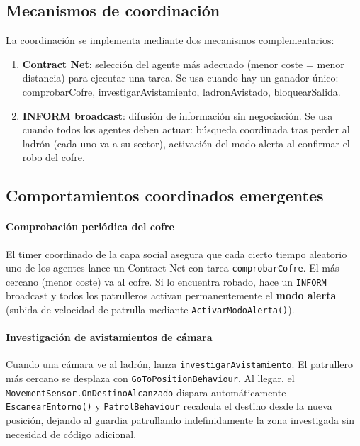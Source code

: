 \documentclass[a4paper,12pt]{article}
\begin{document}
\subsection*{Mecanismos de coordinación}

La coordinación se implementa mediante dos mecanismos complementarios:

\begin{enumerate}
    \item \textbf{Contract Net}: selección del agente más adecuado (menor coste = menor distancia) para ejecutar una tarea. Se usa cuando hay un ganador único: comprobarCofre, investigarAvistamiento, ladronAvistado, bloquearSalida.
    \item \textbf{INFORM broadcast}: difusión de información sin negociación. Se usa cuando todos los agentes deben actuar: búsqueda coordinada tras perder al ladrón (cada uno va a su sector), activación del modo alerta al confirmar el robo del cofre.
\end{enumerate}

\subsection*{Comportamientos coordinados emergentes}

\paragraph{Comprobación periódica del cofre} El timer coordinado de la capa social asegura que cada cierto tiempo aleatorio uno de los agentes lance un Contract Net con tarea \texttt{comprobarCofre}. El más cercano (menor coste) va al cofre. Si lo encuentra robado, hace un \texttt{INFORM} broadcast y todos los patrulleros activan permanentemente el \textbf{modo alerta} (subida de velocidad de patrulla mediante \texttt{ActivarModoAlerta()}).

\paragraph{Investigación de avistamientos de cámara} Cuando una cámara ve al ladrón, lanza \texttt{investigarAvistamiento}. El patrullero más cercano se desplaza con \texttt{GoToPositionBehaviour}. Al llegar, el \texttt{MovementSensor.\allowbreak OnDestinoAlcanzado} dispara automáticamente \texttt{EscanearEntorno()} y \texttt{PatrolBehaviour} recalcula el destino desde la nueva posición, dejando al guardia patrullando indefinidamente la zona investigada sin necesidad de código adicional.
\end{document}
